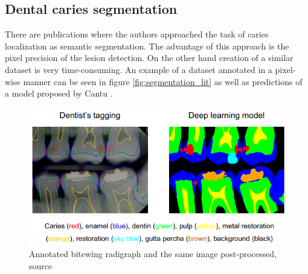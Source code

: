 \subsection{Dental caries segmentation}
There are publications where the authors approached the task of caries localization as semantic segmentation. The advantage of this approach is the pixel precision of the lesion detection. On the other hand creation of a similar dataset is very time-consuming. An example of a dataset annotated in a pixel-wise manner can be seen in figure \ref{fig:segmentation_lit} as well as predictions of a model proposed by Cantu \cite{Cantu2020}.

\begin{figure}
    \centering
    \includegraphics[width=\linewidth]{images/segmentation_bitewing_rich.png}
    \caption{Annotated bitewing radigraph and the same image post-processed, source \cite{Lee2021}}
    \label{fig:bitewing_dense}
\end{figure}

